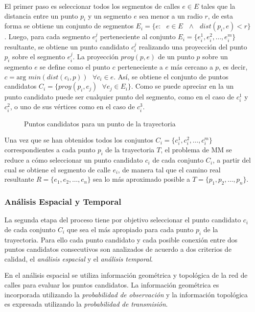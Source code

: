 El primer paso es seleccionar todos los segmentos de calles $e \in E$ tales que la distancia entre un punto $p_i$ y un segmento $e$ sea menor a un radio $r$, de esta forma se obtiene un conjunto de segmentos $E_i = \{ e : \text{ } e \in E \text{ } \wedge \text{ } dist(p_i, e) < r \}$. Luego, para cada segmento $e_{i}^{j}$ perteneciente al conjunto $E_i = \{e_{i}^{1}, e_{i}^{2}, \dots, e_{i}^{m}\}$ resultante, se obtiene un punto candidato $c_{i}^{j}$ realizando una proyección del punto $p_i$ sobre el segmento $e_{i}^{j}$. La proyección $proy(p, e)$ de un punto $p$ sobre un segmento $e$ se define como el punto $c$ perteneciente a $e$ más cercano a $p$, es decir, $c = \text{arg } min(dist(c_i, p)) \text{ } \forall c_i \in e$. Así, se obtiene el conjunto de puntos candidatos $C_i = \{ proy(p_i, e_j) \text{ } \forall e_j \in E_i \}$. Como se puede apreciar en la  un punto candidato puede ser cualquier punto del segmento, como en el caso de $c_{i}^{1}$ y $c_{i}^{2}$, o uno de sus vértices como en el caso de $c_{i}^{3}$.

\begin{figure}[h*]
	\centering
	
	\caption{\label{fig:puntos_candidatos} Puntos candidatos para un punto de la trayectoria}	
\end{figure}

Una vez que se han obtenidos todos los conjuntos $C_i = \{c_{i}^{1}, c_{i}^{2}, \dots, c_{i}^{m}\}$ correspondientes a cada punto $p_i$ de la trayectoria $T$, el problema de MM se reduce a cómo seleccionar un punto candidato $c_i$ de cada conjunto $C_i$, a partir del cual se obtiene el segmento de calle $e_i$, de manera tal que el camino real resultante $R = \{ e_1, e_2, \dots, e_n \}$ sea lo más aproximado posible a $T = \{ p_1, p_2, \dots, p_n\}$.

\subsubsection{Análisis Espacial y Temporal}

La segunda etapa del proceso tiene por objetivo seleccionar el punto candidato $c_i$ de cada conjunto $C_i$ que sea el más apropiado para cada punto $p_i$ de la trayectoria. Para ello cada punto candidato y cada posible conexión entre dos puntos candidatos consecutivos son analizados de acuerdo a dos criterios de calidad, el \emph{análisis espacial} y el \emph{análisis temporal}.

En el análisis espacial se utiliza información geométrica y topológica de la red de calles para evaluar los puntos candidatos. La información geométrica es incorporada utilizando la \emph{probabilidad de observación} y la información topológica es expresada utilizando la \emph{probabilidad de transmisión}.

